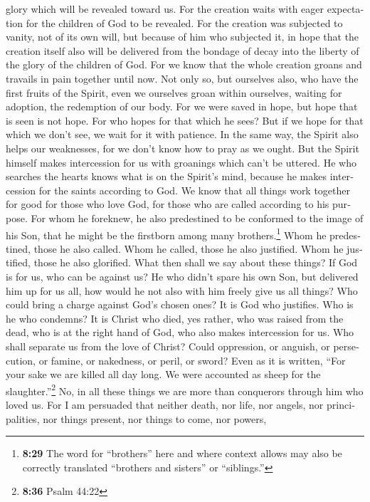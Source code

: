 \begin{paracol}{2}
\begin{otherlanguage}{english}
glory which will be revealed toward us.  For the creation
waits with eager expectation for the children of God to be revealed.
 For the creation was subjected to vanity, not of its own
will, but because of him who subjected it, in hope  that
the creation itself also will be delivered from the bondage of decay
into the liberty of the glory of the children of God. 
For we know that the whole creation groans and travails in pain together
until now.  Not only so, but ourselves also, who have the
first fruits of the Spirit, even we ourselves groan within ourselves,
waiting for adoption, the redemption of our body.  For we
were saved in hope, but hope that is seen is not hope. For who hopes for
that which he sees?  But if we hope for that which we
don't see, we wait for it with patience.  In the same
way, the Spirit also helps our weaknesses, for we don't know how to pray
as we ought. But the Spirit himself makes intercession for us with
groanings which can't be uttered.  He who searches the
hearts knows what is on the Spirit's mind, because he makes intercession
for the saints according to God.  We know that all things
work together for good for those who love God, for those who are called
according to his purpose.  For whom he foreknew, he also
predestined to be conformed to the image of his Son, that he might be
the firstborn among many brothers.\footnote{\textbf{8:29} The word for
  ``brothers'' here and where context allows may also be correctly
  translated ``brothers and sisters'' or ``siblings.''} 
Whom he predestined, those he also called. Whom he called, those he also
justified. Whom he justified, those he also glorified. 
What then shall we say about these things? If God is for us, who can be
against us?  He who didn't spare his own Son, but
delivered him up for us all, how would he not also with him freely give
us all things?  Who could bring a charge against God's
chosen ones? It is God who justifies.  Who is he who
condemns? It is Christ who died, yes rather, who was raised from the
dead, who is at the right hand of God, who also makes intercession for
us.  Who shall separate us from the love of Christ? Could
oppression, or anguish, or persecution, or famine, or nakedness, or
peril, or sword?  Even as it is written, ``For your sake
we are killed all day long. We were accounted as sheep for the
slaughter.''\footnote{\textbf{8:36} Psalm 44:22}  No, in
all these things we are more than conquerors through him who loved us.
 For I am persuaded that neither death, nor life, nor
angels, nor principalities, nor things present, nor things to come, nor
powers,


\end{otherlanguage}
\end{paracol}
